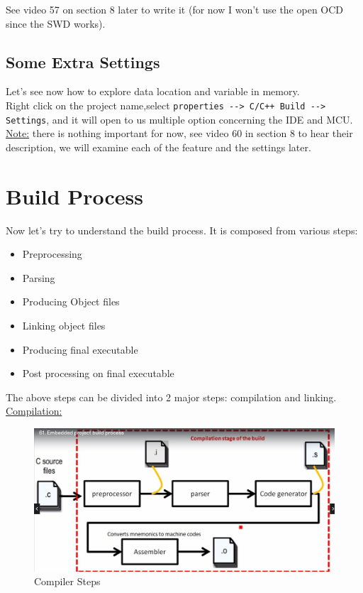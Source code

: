 See video 57 on section 8 later to write it (for now I won't use the open OCD since the SWD works).


\subsection{Some Extra Settings}

Let's see now how to explore data location and variable in memory.\\

Right click on the project name,select \verb|properties --> C/C++ Build --> Settings|, and it will open to us multiple option concerning the IDE and MCU.\\

\underline{Note:} there is nothing important for now, see video 60 in section 8 to hear their description, we will examine each of the feature and the settings later.

\newpage
\section{Build Process}

Now let's try to understand the build process. It is composed from various steps:

\begin{itemize}

\item Preprocessing

\item Parsing

\item Producing Object files

\item Linking object files

\item Producing final executable

\item Post processing on final executable

\end{itemize}


The above steps can be divided into 2 major steps: compilation and linking.\\

\underline{Compilation:}

\begin{figure}[h]
\centering
\includegraphics[scale=0.5]{Figures/Embedded_C/build_compiler_steps}
\caption{Compiler Steps}
\label{fig:Embedded_C:build_compiler_steps}
\end{figure} 

